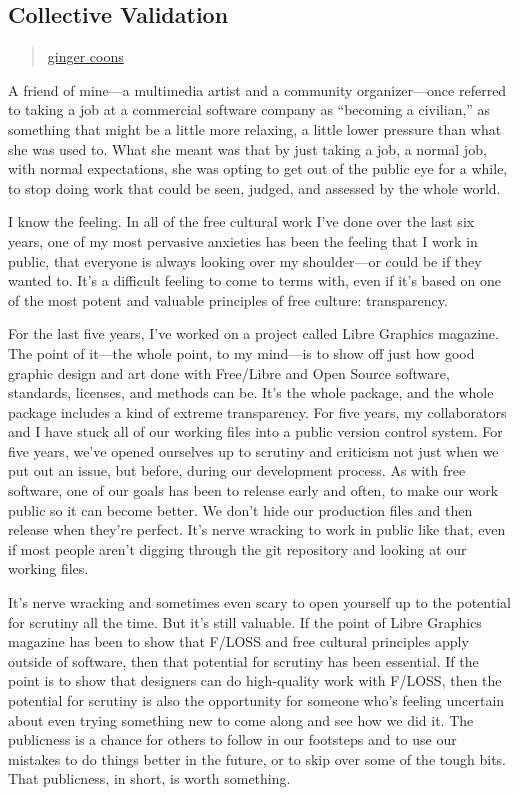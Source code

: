 \subsection{Collective Validation}\label{collective-validation}

\begin{quote}
\href{../appendix/attributions.html\#ginger-coons}{ginger coons}
\end{quote}

A friend of mine---a multimedia artist and a community organizer---once
referred to taking a job at a commercial software company as ``becoming
a civilian,'' as something that might be a little more relaxing, a
little lower pressure than what she was used to. What she meant was that
by just taking a job, a normal job, with normal expectations, she was
opting to get out of the public eye for a while, to stop doing work that
could be seen, judged, and assessed by the whole world.

I know the feeling. In all of the free cultural work I've done over the
last six years, one of my most pervasive anxieties has been the feeling
that I work in public, that everyone is always looking over my
shoulder---or could be if they wanted to. It's a difficult feeling to
come to terms with, even if it's based on one of the most potent and
valuable principles of free culture: transparency.

For the last five years, I've worked on a project called Libre Graphics
magazine. The point of it---the whole point, to my mind---is to show off
just how good graphic design and art done with Free/Libre and Open
Source software, standards, licenses, and methods can be. It's the whole
package, and the whole package includes a kind of extreme transparency.
For five years, my collaborators and I have stuck all of our working
files into a public version control system. For five years, we've opened
ourselves up to scrutiny and criticism not just when we put out an
issue, but before, during our development process. As with free
software, one of our goals has been to release early and often, to make
our work public so it can become better. We don't hide our production
files and then release when they're perfect. It's nerve wracking to work
in public like that, even if most people aren't digging through the git
repository and looking at our working files.

It's nerve wracking and sometimes even scary to open yourself up to the
potential for scrutiny all the time. But it's still valuable. If the
point of Libre Graphics magazine has been to show that F/LOSS and free
cultural principles apply outside of software, then that potential for
scrutiny has been essential. If the point is to show that designers can
do high-quality work with F/LOSS, then the potential for scrutiny is
also the opportunity for someone who's feeling uncertain about even
trying something new to come along and see how we did it. The publicness
is a chance for others to follow in our footsteps and to use our
mistakes to do things better in the future, or to skip over some of the
tough bits. That publicness, in short, is worth something.

